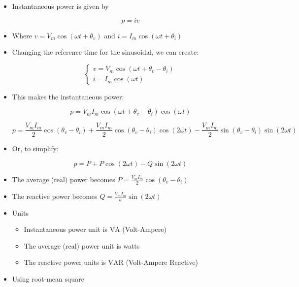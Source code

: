 \begin{itemize}

  \item Instantaneous power is given by

    $$p=iv$$

  \item Where $v=V_m\cos(\omega t+\theta_v)$ and $i=I_m\cos(\omega t + \theta_i)$

  \item Changing the reference time for the sinusoidal, we can create:

    $$\left\{\begin{array}{c} v= V_m\cos(\omega t + \theta_v - \theta_i)\\ i=I_m\cos(\omega t)\end{array}$$

  \item This makes the instantaneous power:

    $$p=V_mI_m\cos(\omega t + \theta_v - \theta_i)\cos(\omega t)$$

    $$p=\frac{V_mI_m}{2}\cos(\theta_v-\theta_i)+\frac{V_mI_m}{2}\cos(\theta_v-\theta_i)\cos(2\omega t)-\frac{V_mI_m}{2}\sin(\theta_v-\theta_i)\sin(2\omega t)$$

  \item Or, to simplify:

    $$p=P+P\cos(2\omega t)-Q\sin(2\omega t)$$

  \item The average (real) power becomes $P=\frac{V_mI_m}{2}\cos(\theta_v-\theta_i)$

  \item The reactive power becomes $Q=\frac{V_mI_m}{w}\sin(2\omega t)$

  \item Units

    \begin{itemize}

      \item Instantaneous power unit is $\si{\volt\ampere}$ (Volt-Ampere)

      \item The average (real) power unit is watts

      \item The reactive power units is $\si{\volt\ampere}$R (Volt-Ampere Reactive)

    \end{itemize}

  \item Using root-mean square


\end{itemize}
